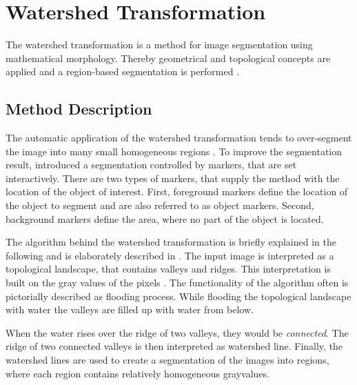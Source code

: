 
\section{Watershed Transformation}\label{ord:ch3:sec2}

The watershed transformation is a method for image segmentation using mathematical morphology. 
Thereby geometrical and topological concepts are applied and a region-based segmentation is performed \cite{VS91-Watershed} \cite{Beu00-Watersheds}.


\subsection{Method Description}\label{ord:ch3:sec2:subsec1}

The automatic application of the watershed transformation tends to over-segment the image into many small homogeneous regions \cite{Beu00-Watersheds}.
To improve the segmentation result, \cite{MS90-MorpologicalSegmentation} introduced a segmentation controlled by markers, that are set interactively.
There are two types of markers, that supply the method with the location of the object of interest.
First, foreground markers define the location of the object to segment and are also referred to as object markers.
Second, background markers define the area, where no part of the object is located.

The algorithm behind the watershed transformation is briefly explained in the following and is elaborately described in \cite{Beu00-Watersheds}.
The input image is interpreted as a topological landscape, that contains valleys and ridges.
This interpretation is built on the gray values of the pixels \cite{PB14-ImageAnalysis}.
The functionality of the algorithm often is pictorially described as flooding process.
While flooding the topological landscape with water the valleys are filled up with water from below.

When the water rises over the ridge of two valleys, they would be \textit{connected}. 
The ridge of two connected valleys is then interpreted as watershed line.
Finally, the watershed lines are used to create a segmentation of the images into regions, where each region contains relatively homogeneous grayvalues.


